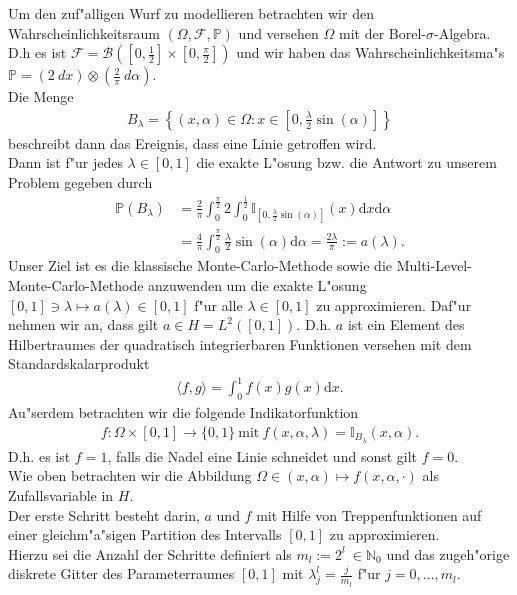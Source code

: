 Um den zuf"alligen Wurf zu modellieren betrachten wir den Wahrscheinlichkeitsraum $(\Omega,\mathcal{F},\mathbb{P})$  und versehen $\Omega$ mit der Borel-$\sigma$-Algebra.\\ D.h es ist $\mathcal{F}=\mathcal{B}\left([0,\frac{1}{2}]\times[0,\frac{\pi}{2}]\right)$ und wir haben das Wahrscheinlichkeitsma"s\\ $\mathbb{P}=(2 \ dx) \otimes(\frac{2}{\pi} \ d\alpha)$.\\
Die Menge 
\begin{align*}
B_\lambda=\left\{(x,\alpha)\in \Omega: x\in [0,\frac{\lambda}{2}\sin(\alpha)]\right\}
\end{align*}
beschreibt dann das Ereignis, dass eine Linie getroffen wird.\\
Dann ist f"ur jedes $\lambda\in[0,1]$ die exakte L"osung bzw. die Antwort zu unserem Problem gegeben durch 
\begin{align*}
\mathbb{P}(B_\lambda)&=\frac{2}{\pi}\int_0^\frac{\pi}{2} 2 \int_0^\frac{1}{2} \mathbb{I}_{[0,\frac{\lambda}{2}\sin(\alpha)]}(x)\text{d}x \text{d}\alpha\\&=\frac{4}{\pi}\int_0^\frac{\pi}{2}\frac{\lambda}{2}\sin(\alpha)\text{d}\alpha=\frac{2\lambda}{\pi}:=a(\lambda).
\end{align*}
Unser Ziel ist es die klassische Monte-Carlo-Methode sowie die Multi-Level-Monte-Carlo-Methode anzuwenden um die exakte L"osung $[0,1]\ni \lambda \longmapsto a(\lambda)\in [0,1]$ f"ur alle $\lambda \in [0,1]$ zu approximieren.
Daf"ur nehmen wir an, dass gilt $a\in H=L^2([0,1]).$ D.h. $a$ ist ein Element des Hilbertraumes der quadratisch integrierbaren Funktionen versehen mit dem Standardskalarprodukt
\begin{align*}
\langle f,g \rangle=\int_0^1 f(x)g(x) \text{d}x.
\end{align*}
Au"serdem betrachten wir die folgende Indikatorfunktion
\begin{align*}
f:\Omega\times[0,1]\rightarrow \{0,1\} \ \text{mit} \ f(x,\alpha,\lambda)=\mathbb{I}_{B_\lambda}(x,\alpha).
\end{align*}
D.h. es ist $f=1$, falls die Nadel eine Linie schneidet und sonst gilt $f=0$.\\
Wie oben betrachten wir die Abbildung $\Omega\in(x,\alpha)\longmapsto f(x,\alpha, \cdot)$ als Zufallsvariable in $H$.\\[0,2cm]

Der erste Schritt besteht darin, $a$ und $f$ mit Hilfe von Treppenfunktionen auf einer gleichm"a"sigen Partition des Intervalls $[0,1]$ zu approximieren.\\
Hierzu sei die Anzahl der Schritte definiert als $m_l:=2^l \ \in \mathbb{N}_0$ und das zugeh"orige diskrete Gitter des Parameterraumes $[0,1]$ mit $\lambda_j^l=\frac{j}{m_l}$ f"ur $j=0,...,m_l$.\vspace{0,2cm}

